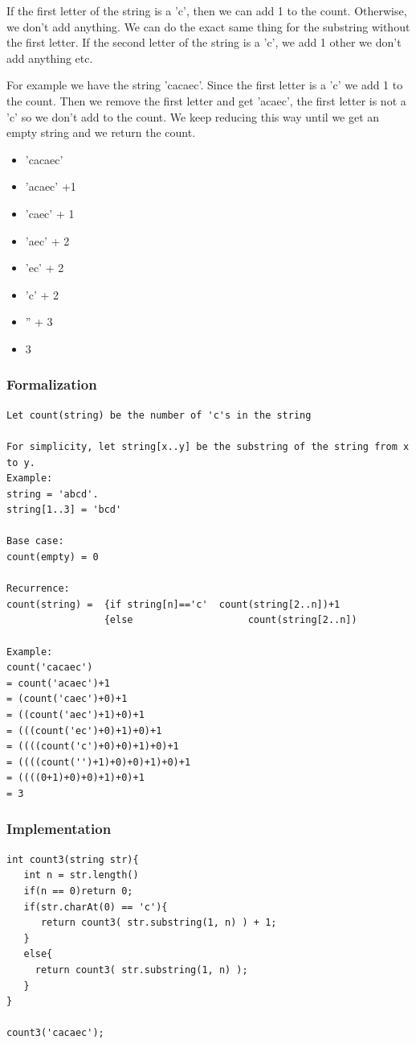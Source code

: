 \documentclass[11pt,oneside]{book}
\begin{document}
If the first letter of the string is a 'c', then we can add 1 to the count. Otherwise, we don't add anything. We can do the exact same thing for the substring without the first letter. If the second letter of the string is a 'c', we add 1 other we don't add anything etc.

For example we have the string 'cacaec'. Since the first letter is a 'c' we add 1 to the count. Then we remove the first letter and get 'acaec', the first letter is not a 'c' so we don't add to the count. We keep reducing this way until we get an empty string and we return the count.

\begin{itemize}
\item 'cacaec'
\item 'acaec' +1
\item 'caec' + 1
\item 'aec' + 2
\item 'ec' + 2
\item 'c'  + 2
\item '' + 3
\item 3
\end{itemize}

\subsubsection{Formalization}

\begin{lstlisting}
Let count(string) be the number of 'c's in the string

For simplicity, let string[x..y] be the substring of the string from x to y.
Example: 
string = 'abcd'.
string[1..3] = 'bcd'

Base case:
count(empty) = 0

Recurrence:
count(string) =  {if string[n]=='c'  count(string[2..n])+1
                 {else                    count(string[2..n])

Example:
count('cacaec')
= count('acaec')+1
= (count('caec')+0)+1
= ((count('aec')+1)+0)+1
= (((count('ec')+0)+1)+0)+1
= ((((count('c')+0)+0)+1)+0)+1
= ((((count('')+1)+0)+0)+1)+0)+1
= ((((0+1)+0)+0)+1)+0)+1
= 3
\end{lstlisting}

\subsubsection{Implementation}

\begin{lstlisting}
int count3(string str){
   int n = str.length()
   if(n == 0)return 0;
   if(str.charAt(0) == 'c'){
      return count3( str.substring(1, n) ) + 1;
   }
   else{
     return count3( str.substring(1, n) );
   }
}

count3('cacaec');

\end{lstlisting}
\end{document}
